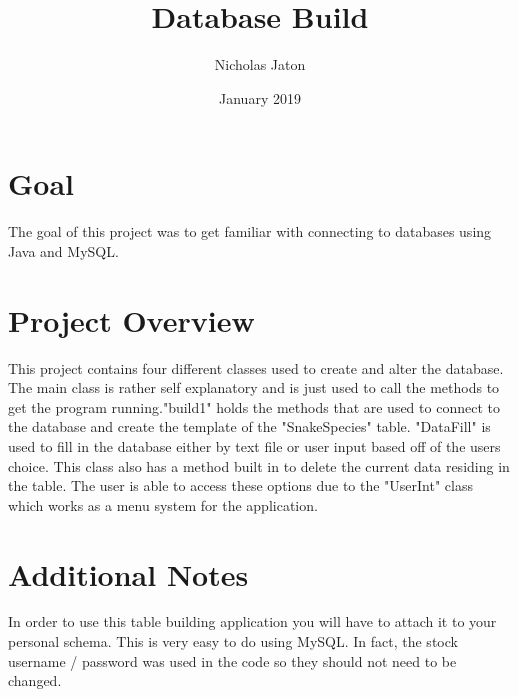 \documentclass{article}
\title {Database Build}
\author{ Nicholas Jaton}
\date{January 2019}
\begin{document}
\begin{titlepage}
\maketitle
\end {titlepage}

\section{Goal}
	The goal of this project was to get familiar with connecting to databases using Java and MySQL. 

\section{Project Overview} 
	This project contains four different classes used to create and alter the database. The main class is rather self explanatory and is just used to call the methods to get the program running."build1" holds the methods that are used to connect to the database and create the template of the "SnakeSpecies" table. "DataFill" is used to fill in the database either by text file or user input based off of the users choice. This class also has a method built in to delete the current data residing in the table. The user is able to access these options due to the "UserInt" class which works as a menu system for the application. 

\section{Additional Notes} 
	In order to use this table building application you will have to attach it to your personal schema. This is very easy to do using MySQL. In fact, the stock username / password was used in the code so they should not need to be changed. 
\end{document}
